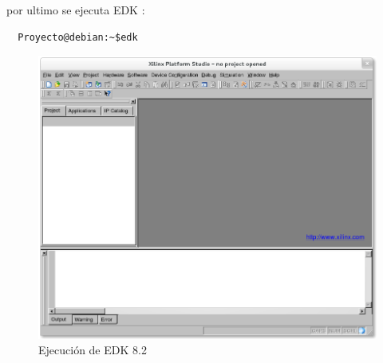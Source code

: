  por ultimo se ejecuta EDK :
 
     \begin{verbatim}		
  Proyecto@debian:~$edk
  \end{verbatim}
  
    \begin{figure}[ht]
  \begin{center}
 \includegraphics[scale=.40]{./figuras/edk.png}
  \caption{Ejecución de EDK 8.2}
 \label{Ejecución de EDK 8.2}
 \end{center}
\end{figure}
  
  


